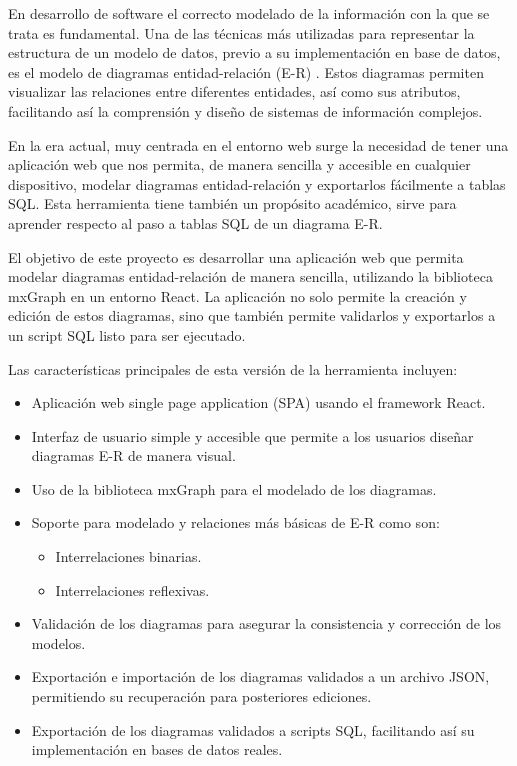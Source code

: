 
En desarrollo de software el correcto modelado de la información con la que se trata es fundamental. Una de las técnicas más utilizadas para representar la estructura de un modelo de datos, previo a su implementación en base de datos, es el modelo de diagramas entidad-relación (E-R) \cite{journals/tods/Chen76}. Estos diagramas permiten visualizar las relaciones entre diferentes entidades, así como sus atributos, facilitando así la comprensión y diseño de sistemas de información complejos.

En la era actual, muy centrada en el entorno web surge la necesidad de tener una aplicación web que nos permita, de manera sencilla y accesible en cualquier dispositivo, modelar diagramas entidad-relación y exportarlos fácilmente a tablas SQL. Esta herramienta tiene también un propósito académico, sirve para aprender respecto al paso a tablas SQL de un diagrama E-R.

El objetivo de este proyecto es desarrollar una aplicación web que permita modelar diagramas entidad-relación de manera sencilla, utilizando la biblioteca mxGraph en un entorno React. La aplicación no solo permite la creación y edición de estos diagramas, sino que también permite validarlos y exportarlos a un script SQL listo para ser ejecutado.

Las características principales de esta versión de la herramienta incluyen:
\begin{itemize}
\tightlist
    \item Aplicación web single page application (SPA) usando el framework React.
    \item Interfaz de usuario simple y accesible que permite a los usuarios diseñar diagramas E-R de manera visual.
    \item Uso de la biblioteca mxGraph para el modelado de los diagramas.
    \item Soporte para modelado y relaciones más básicas de E-R como son:
    \begin{itemize}
    \tightlist
        \item Interrelaciones binarias.
        \item Interrelaciones reflexivas.
    \end{itemize}
    \item Validación de los diagramas para asegurar la consistencia y corrección de los modelos.
    \item Exportación e importación de los diagramas validados a un archivo JSON, permitiendo su recuperación para posteriores ediciones.
    \item Exportación de los diagramas validados a scripts SQL, facilitando así su implementación en bases de datos reales.
\end{itemize}

